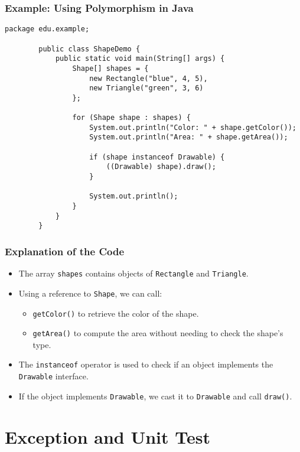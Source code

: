 \documentclass[aspectratio=169, table]{beamer}
\begin{document}
\begin{frame}[fragile]
	\frametitle{Example: Using Polymorphism in Java}
	
	\begin{lstlisting}[style=JavaStyle, caption={Example of Polymorphism: \texttt{ShapeDemo.java}}]
		package edu.example;
		
		public class ShapeDemo {
			public static void main(String[] args) {
				Shape[] shapes = {
					new Rectangle("blue", 4, 5),
					new Triangle("green", 3, 6)
				};
				
				for (Shape shape : shapes) {
					System.out.println("Color: " + shape.getColor());
					System.out.println("Area: " + shape.getArea());
					
					if (shape instanceof Drawable) {
						((Drawable) shape).draw();
					}
					
					System.out.println();
				}
			}
		}
	\end{lstlisting}
\end{frame}

\begin{frame}[fragile]
	\frametitle{Explanation of the Code}
	
	\begin{itemize}
		\item The array \texttt{shapes} contains objects of \texttt{Rectangle} and \texttt{Triangle}.
		\item Using a reference to \texttt{Shape}, we can call:
		\begin{itemize}
			\item \texttt{getColor()} to retrieve the color of the shape.
			\item \texttt{getArea()} to compute the area without needing to check the shape's type.
		\end{itemize}
		\item The \texttt{instanceof} operator is used to check if an object implements the \texttt{Drawable} interface.
		\item If the object implements \texttt{Drawable}, we cast it to \texttt{Drawable} and call \texttt{draw()}.
	\end{itemize}
\end{frame}

\section{Exception and Unit Test}
\end{document}
